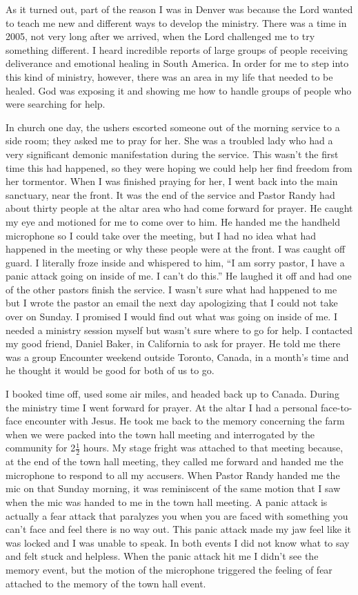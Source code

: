 \documentclass[twoside, 12pt]{book}
\begin{document}
As it turned out, part of the reason I was in Denver was because the Lord wanted to teach me new and different ways to develop the ministry. There was a time in 2005, not very long after we arrived, when the Lord challenged me to try something different. I heard incredible reports of large groups of people receiving deliverance and emotional healing in South America. In order for me to step into this kind of ministry, however, there was an area in my life that needed to be healed. God was exposing it and showing me how to handle groups of people who were searching for help.

In church one day, the ushers escorted someone out of the morning service to a side room; they asked me to pray for her. She was a troubled lady who had a very significant demonic manifestation during the service. This wasn’t the first time this had happened, so they were hoping we could help her find freedom from her tormentor. When I was finished praying for her, I went back into the main sanctuary, near the front. It was the end of the service and Pastor Randy had about thirty people at the altar area who had come forward for prayer. He caught my eye and motioned for me to come over to him. He handed me the handheld microphone so I could take over the meeting, but I had no idea what had happened in the meeting or why these people were at the front. I was caught off guard. I literally froze inside and whispered to him, “I am sorry pastor, I have a panic attack going on inside of me. I can’t do this.” He laughed it off and had one of the other pastors finish the service. I wasn’t sure what had happened to me but I wrote the pastor an email the next day apologizing that I could not take over on Sunday. I promised I would find out what was going on inside of me. I needed a ministry session myself but wasn’t sure where to go for help. I contacted my good friend, Daniel Baker, in California to ask for prayer. He told me there was a group Encounter weekend outside Toronto, Canada, in a month's time and he thought it would be good for both of us to go. 

I booked time off, used some air miles, and headed back up to Canada. During the ministry time I went forward for prayer. At the altar I had a personal face-to-face encounter with Jesus. He took me back to the memory concerning the farm when we were packed into the town hall meeting and interrogated by the community for 2$\frac{1}{2}$ hours. My stage fright was attached to that meeting because, at the end of the town hall meeting, they called me forward and handed me the microphone to respond to all my accusers. When Pastor Randy handed me the mic on that Sunday morning, it was reminiscent of the same motion that I saw when the mic was handed to me in the town hall meeting. A panic attack is actually a fear attack that paralyzes you when you are faced with something you can’t face and feel there is no way out. This panic attack made my jaw feel like it was locked and I was unable to speak. In both events I did not know what to say and felt stuck and helpless. When the panic attack hit me I didn’t see the memory event, but the motion of the microphone triggered the feeling of fear attached to the memory of the town hall event. 
\end{document}
